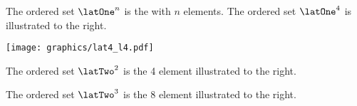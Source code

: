 \begin{minipage}{\tw-35mm}
\begin{example}
The ordered set $\latOne^n$ is the  with $n$ elements.
The ordered set $\latOne^4$ is illustrated to the right.
\end{example}
\end{minipage}%
\hfill\texttt{[image: graphics/lat4\_l4.pdf]}\hfill\mbox{}\\%

\begin{minipage}{\tw-35mm}
\begin{example}
The ordered set $\latTwo^2$ is the 4 element  illustrated to the right.
\end{example}
\end{minipage}%
\begin{minipage}{3\tw/16}\center%
\end{minipage}

\begin{minipage}{\tw-35mm}
\begin{example}
The ordered set $\latTwo^3$ is the 8 element  illustrated to the right.
\end{example}
\end{minipage}%
\begin{minipage}{3\tw/16}\center%
\end{minipage}





